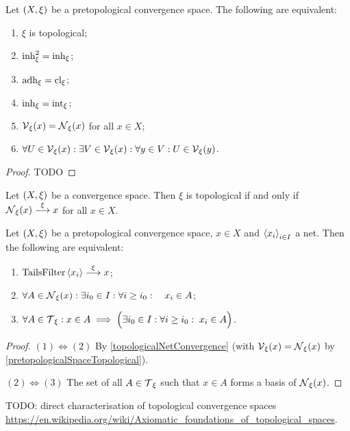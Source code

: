 \begin{proposition} \label{pretopologicalSpaceTopological}
Let $\left( X,\xi \right)$ be a pretopological convergence space. The following are equivalent:
\begin{enumerate}
\item $\xi$ is topological;
\item $\operatorname{inh}_\xi^2 = \operatorname{inh}_\xi$;
\item $\operatorname{adh}_\xi = \operatorname{cl}_\xi$;
\item $\operatorname{inh}_\xi = \operatorname{int}_\xi$;
\item $\operatorname{\mathcal{V}}_\xi(x) = \operatorname{\mathcal{N}}_\xi(x)$ for all $x\in X$;
\item $\forall U\in \operatorname{\mathcal{V}}_\xi(x): \exists V\in \operatorname{\mathcal{V}}_\xi(x): \forall y\in V: U\in\operatorname{\mathcal{V}}_\xi(y)$.
\end{enumerate}
\end{proposition}
\begin{proof}
TODO
\end{proof}
\begin{corollary}
Let $\left( X,\xi \right)$ be a convergence space. Then $\xi$ is topological \textup{if and only if} $\operatorname{\mathcal{N}}_\xi(x) \overset{\xi}{\longrightarrow} x$ for all $x\in X$.
\end{corollary}

\begin{lemma} \label{topologicalNetConvergence}
Let $\left( X,\xi \right)$ be a pretopological convergence space, $x\in X$ and $\left\langle x_i \right\rangle_{i\in I}$ a net. Then the following are equivalent:
\begin{enumerate}
\item $\operatorname{TailsFilter}\left\langle x_i \right\rangle \overset{\xi}{\longrightarrow} x$;
\item $\forall A\in \operatorname{\mathcal{N}}_\xi(x): \exists i_0\in I: \forall i \geq i_0: \quad x_i\in A$;
\item $\forall A\in \operatorname{\mathcal{T}}_\xi: x\in A \implies \Big(\exists i_0\in I: \forall i \geq i_0: \; x_i\in A\Big)$.
\end{enumerate}
\end{lemma}
\begin{proof}
$(1) \Leftrightarrow (2)$ By \ref{topologicalNetConvergence} (with $\operatorname{\mathcal{V}}_\xi(x) = \operatorname{\mathcal{N}}_\xi(x)$ by \ref{pretopologicalSpaceTopological}).


$(2) \Leftrightarrow (3)$ The set of all $A\in \operatorname{\mathcal{T}}_\xi$ such that $x\in A$ forms a basis of $\operatorname{\mathcal{N}}_\xi(x)$.
\end{proof}

TODO: direct characterisation of topological convergence spaces \url{https://en.wikipedia.org/wiki/Axiomatic_foundations_of_topological_spaces}.

